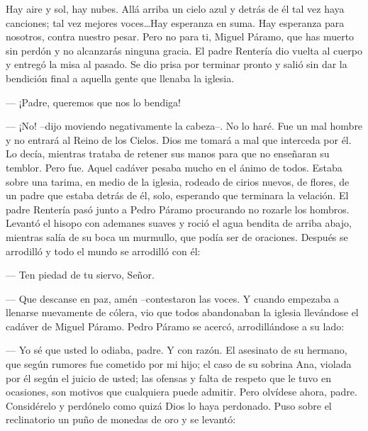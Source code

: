   \guillemotleft Hay aire y sol, hay nubes. Allá arriba un cielo azul y detrás de él tal vez haya canciones; tal vez mejores voces\ldots Hay esperanza en suma. Hay esperanza para nosotros, contra nuestro pesar.
\pend
%
\pstart
  \guillemotright Pero no para ti, Miguel Páramo, que has muerto sin perdón y no alcanzarás ninguna gracia.\guillemotright
\pend
%
\pstart
  El padre Rentería dio vuelta al cuerpo y entregó la misa al pasado. Se dio prisa por terminar pronto y salió sin dar la bendición final a aquella gente que llenaba la iglesia.

  --- ¡Padre, queremos que nos lo bendiga!

  --- ¡No! --dijo moviendo negativamente la cabeza--. No lo haré. Fue un mal hombre y no entrará al Reino de los Cielos. Dios me tomará a mal que interceda por él.
\pend
%
\pstart
  Lo decía, mientras trataba de retener sus manos para que no enseñaran su temblor. Pero fue.
\pend
%
\pstart
  Aquel cadáver pesaba mucho en el ánimo de todos. Estaba sobre una tarima, en medio de la iglesia, rodeado de cirios nuevos, de flores, de un padre que estaba detrás de él, solo, esperando que terminara la velación.
\pend
%
\pstart
  El padre Rentería pasó junto a Pedro Páramo procurando no rozarle los hombros. Levantó el hisopo con ademanes suaves y roció el agua bendita de arriba abajo, mientras salía de su boca un murmullo, que podía ser de oraciones. Después se arrodilló y todo el mundo se arrodilló con él:

  --- Ten piedad de tu siervo, Señor.

  --- Que descanse en paz, amén --contestaron las voces.
\pend
%
\pstart
  Y cuando empezaba a llenarse nuevamente de cólera, vio que todos abandonaban la iglesia llevándose el cadáver de Miguel Páramo.
\pend
%
\pstart
  Pedro Páramo se acercó, arrodillándose a su lado:

  --- Yo sé que usted lo odiaba, padre. Y con razón. El asesinato de su hermano, que según rumores fue cometido por mi hijo; el caso de su sobrina Ana, violada por él según el juicio de usted; las ofensas y falta de respeto que le tuvo en ocasiones, son motivos que cualquiera puede admitir. Pero olvídese ahora, padre. Considérelo y perdónelo como quizá Dios lo haya perdonado.
\pend
%
\pstart
  Puso sobre el reclinatorio un puño de monedas de oro y se levantó:

